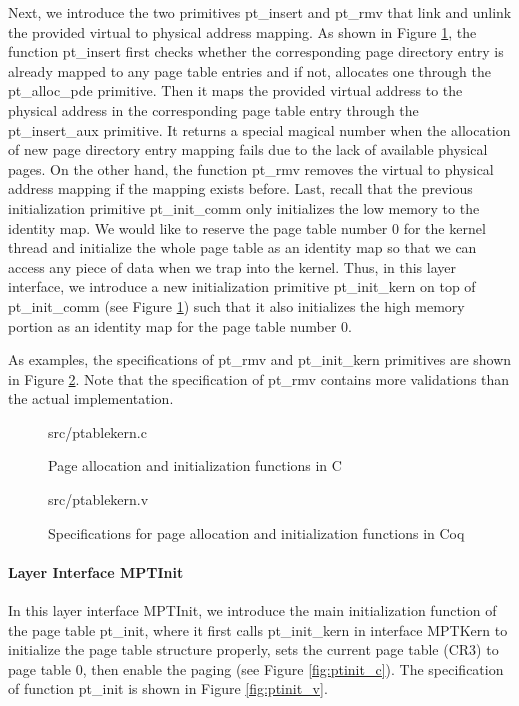 Next, we introduce the two primitives \textsf{pt\_insert} and \textsf{pt\_rmv} that
link and unlink the provided virtual to physical address mapping.
As shown in Figure \ref{fig:ptablekern_c}, the function \textsf{pt\_insert}
first checks whether the corresponding page directory entry is already mapped
to any page table entries and if not, allocates one through the \textsf{pt\_alloc\_pde}
primitive. Then it maps the provided virtual address to the physical address in the
corresponding page table entry through the \textsf{pt\_insert\_aux} primitive.
It returns a special magical number when the allocation of new page directory entry
mapping fails due to the lack of available physical pages.
On the other hand, the function \textsf{pt\_rmv} removes the virtual to physical
address mapping if the mapping exists before.
Last, recall that the previous initialization primitive \textsf{pt\_init\_comm} only
initializes the low memory to the identity map. We would like to reserve the page
table number 0 for the kernel thread and initialize the whole page table as an
identity map so that we can access any piece of data when we trap into the kernel.
Thus, in this layer interface, we introduce a new initialization primitive
\textsf{pt\_init\_kern} on top of \textsf{pt\_init\_comm}
(see Figure \ref{fig:ptablekern_c}) such that it also
initializes the high memory portion as an identity map for the page table number 0.

As examples, the specifications of \textsf{pt\_rmv} and \textsf{pt\_init\_kern}
primitives are shown in Figure \ref{fig:ptablekern_v}.
Note that the specification of \textsf{pt\_rmv} contains more validations
than the actual implementation.


\begin{figure}
	 {src/ptablekern.c}
	\caption{Page allocation and initialization functions in C}
	\label{fig:ptablekern_c}
\end{figure}

\begin{figure}
	 {src/ptablekern.v}
	\caption{Specifications for page allocation and initialization functions in Coq}
	\label{fig:ptablekern_v}
\end{figure}

\paragraph{Layer Interface MPTInit}

In this layer interface MPTInit, we introduce the main initialization function of the page table
\textsf{pt\_init}, where it first calls \textsf{pt\_init\_kern} in interface MPTKern to initialize the 
page table structure properly, sets the current page table (CR3) to page table 0, then enable
the paging (see Figure \ref{fig:ptinit_c}).
The specification of function \textsf{pt\_init} is shown in Figure \ref{fig:ptinit_v}.

